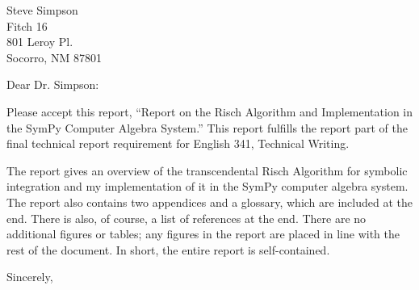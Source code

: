 \documentclass{letter}
\date{December 10, 2010}
\begin{document}
\begin{letter}{Steve Simpson\\
Fitch 16\\
801 Leroy Pl.\\
Socorro, NM 87801
}
\opening{Dear Dr. Simpson:}

Please accept this report, ``Report  on the Risch Algorithm and
Implementation in the SymPy Computer Algebra System.''  This report
fulfills the report part of the final technical report requirement for
English 341, Technical Writing.

The report gives an overview of the transcendental Risch Algorithm for
symbolic integration and my implementation of it in the SymPy computer
algebra system.  The report also contains two appendices and a glossary,
which are included at the end.  There is also, of course, a list of
references at the end.  There are no additional figures or tables; any
figures in the report are placed in line with the rest of the document.
In short, the entire report is self-contained.

\closing{Sincerely,}
\end{letter}
\end{document}
